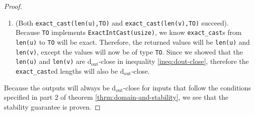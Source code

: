 \documentclass[12pt,letterpaper]{article}
\newcommand{\dout}{\mathrm{d_{out}}}
\theoremstyle{definition}
\begin{document}
\begin{proof}
\begin{enumerate}
    \item (Both \texttt{exact\_cast(len(u),TO)} and \texttt{exact\_cast(len(v),TO)} succeed). Because \texttt{TO} implements \texttt{ExactIntCast(usize)}, we know \texttt{exact\_cast}s from \texttt{len(u)} to \texttt{TO} will be exact. Therefore, the returned values will be \texttt{len(u)} and \texttt{len(v)}, except the values will now be of type \texttt{TO}. Since we showed that the \texttt{len(u)} and \texttt{len(v)} are $\dout$-close in inequality \ref{ineq:dout-close}, therefore the \texttt{exact\_cast}ed lengths will also be $\dout$-close.
\end{enumerate}

Because the outputs will always be $\dout$-close for inputs that follow the conditions specified in part 2 of theorem \ref{thrm:domain-and-stability}, we see that the stability guarantee is proven.

\end{proof}
\end{document}
